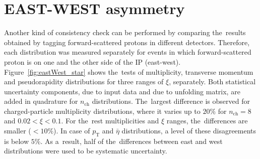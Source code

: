 \section{EAST-WEST asymmetry}\label{section:star_eastWest}
Another kind of consistency check can be performed by comparing the~results obtained by tagging forward-scattered protons in different detectors.
Therefore, each distribution was measured separately for events in which forward-scattered proton
is on one and the other side of the IP (east-west). 
Figure~\ref{fig:eastWest_star} shows the~tests of multiplicity, transverse momentum and pseudorapidity distributions for three ranges of $\xi$, separately. Both statistical uncertainty components, due to input data and due to unfolding matrix, are added in quadrature for $n_\textrm{ch}$ distributions.
The~largest difference is observed for charged-particle multiplicity distributions, where it varies up to $20\%$ for $n_\textrm{ch}=8$ and $0.02 < \xi < 0.1$. 
For the~rest multiplicities and $\xi$ ranges, the~differences are smaller ($<10\%$). In case of $p_\textrm{T}$ and $\bar{\eta}$ distributions, a level of  these disagreements is  below $5\%$. As a~result,
half of the~differences between east and west distributions were used to be  systematic uncertainty.

